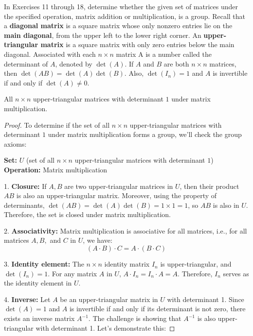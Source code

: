\documentclass[12pt]{amsart}
\theoremstyle{definition}
\numberwithin{equation}{section}
\theoremstyle{plain}
\begin{document}
    \begin{exercise}{17}
        In Exercises 11 through 18, determine whether the given set of matrices under the specified operation, matrix addition or multiplication, is a group. 
        Recall that a \textbf{diagonal matrix} is a square matrix whose only nonzero entries lie on the \textbf{main diagonal}, from the upper left to the lower right corner. An \textbf{upper-triangular matrix} is a square matrix with only zero entries below the main diagonal. 
        Associated with each $n \times n$ matrix A is a number called the determinant of $A$, denoted by $\det(A)$. If $A$ and $B$ are both $n \times n$ matrices, then $\det(AB) = \det(A) \det(B)$. Also, $\det(I_n) = 1$ and $A$ is invertible if and only if $\det(A) \neq 0$.

        All $n\times n$ upper-triangular matrices with determinant $1$ under matrix multiplication.
        \begin{proof}
            To determine if the set of all \( n \times n \) upper-triangular matrices with determinant \( 1 \) under matrix multiplication forms a group, we'll check the group axioms:

\textbf{Set:} \( U \) (set of all \( n \times n \) upper-triangular matrices with determinant \( 1 \))  
\textbf{Operation:} Matrix multiplication

1. \textbf{Closure:} If \( A, B \) are two upper-triangular matrices in \( U \), then their product \( AB \) is also an upper-triangular matrix. Moreover, using the property of determinants, \( \det(AB) = \det(A) \det(B) = 1 \times 1 = 1 \), so \( AB \) is also in \( U \). Therefore, the set is closed under matrix multiplication.

2. \textbf{Associativity:} Matrix multiplication is associative for all matrices, i.e., for all matrices \( A, B, \) and \( C \) in \( U \), we have:
\[ (A \cdot B) \cdot C = A \cdot (B \cdot C) \]

3. \textbf{Identity element:} The \( n \times n \) identity matrix \( I_n \) is upper-triangular, and \( \det(I_n) = 1 \). For any matrix \( A \) in \( U \), \( A \cdot I_n = I_n \cdot A = A \). Therefore, \( I_n \) serves as the identity element in \( U \).

4. \textbf{Inverse:} Let \( A \) be an upper-triangular matrix in \( U \) with determinant 1. Since \( \det(A) = 1 \) and \( A \) is invertible if and only if its determinant is not zero, there exists an inverse matrix \( A^{-1} \). The challenge is showing that \( A^{-1} \) is also upper-triangular with determinant 1. Let's demonstrate this:


\end{proof}
\end{exercise}
\end{document}
